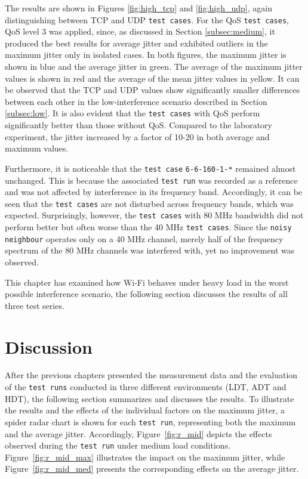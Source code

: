 The results are shown in Figures  \ref{fig:high_tcp} and \ref{fig:high_udp}, again distinguishing between \ac{TCP} and \ac{UDP} \texttt{test cases}.  
For the \ac{QoS} \texttt{test cases}, \ac{QoS} level 3 was applied, since, as discussed in Section \ref{subsec:medium}, it produced the best results for average jitter and exhibited outliers in the maximum jitter only in isolated cases.  
In both figures, the maximum jitter is shown in blue and the average jitter in green.  
The average of the maximum jitter values is shown in red and the average of the mean jitter values in yellow.  
It can be observed that the \ac{TCP} and \ac{UDP} values show significantly smaller differences between each other in the low-interference scenario described in Section \ref{subsec:low}.  
It is also evident that the \texttt{test cases} with \ac{QoS} perform significantly better than those without \ac{QoS}.  
Compared to the laboratory experiment, the jitter increased by a factor of 10-20 in both average and maximum values.  

Furthermore, it is noticeable that the \texttt{test case} \texttt{6-6-160-1-*} remained almost unchanged.  
This is because the associated \texttt{test run} was recorded as a reference and was not affected by interference in its frequency band.  
Accordingly, it can be seen that the \texttt{test cases} are not disturbed across frequency bands, which was expected.  
Surprisingly, however, the \texttt{test cases} with 80 MHz bandwidth did not perform better but often worse than the 40 MHz \texttt{test cases}.  
Since the \texttt{noisy neighbour} operates only on a 40 MHz channel, merely half of the frequency spectrum of the 80 MHz channels was interfered with, yet no improvement was observed.  

This chapter has examined how Wi-Fi behaves under heavy load in the worst possible interference scenario, the following section discusses the results of all three test series.  

\section{Discussion} \label{subsec:disc}
After the previous chapters presented the measurement data and the evaluation of the \texttt{test runs} conducted in three different environments (\ac{LDT}, \ac{ADT} and \ac{HDT}), the following section summarizes and discusses the results.  
To illustrate the results and the effects of the individual factors on the maximum jitter, a spider radar chart is shown for each \texttt{test run}, representing both the maximum and the average jitter.  
Accordingly, Figure~\ref{fig:r_mid} depicts the effects observed during the \texttt{test run} under medium load conditions.  
Figure~\ref{fig:r_mid_max} illustrates the impact on the maximum jitter, while Figure~\ref{fig:r_mid_med} presents the corresponding effects on the average jitter.  

